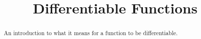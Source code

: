 \documentclass{ximera}
\title{Differentiable Functions}
\begin{document}
\begin{abstract}
An introduction to what it means for a function to be differentiable.
\end{abstract}
\maketitle
\end{document}
